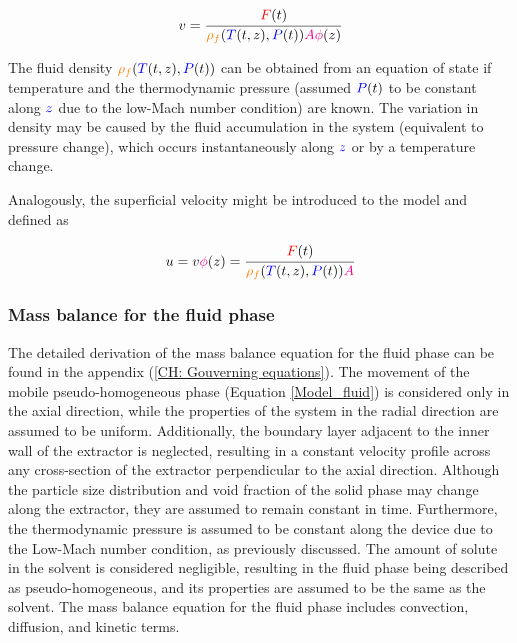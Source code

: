 \documentclass[../Article_Model_Parameters.tex]{subfiles}
\begin{document}
	{\footnotesize
	\begin{equation}
		v = \cfrac{{\color{red}F}(t)}{{\color{orange}\rho_f}({\color{blue}T}(t,z),{\color{blue}P}(t)) {\color{magenta}A\phi}(z)} 
	\end{equation}
	}
	
	The fluid density ${\color{orange}\rho_f}({\color{blue}T}(t,z),{\color{blue}P}(t))$ can be obtained from an equation of state if temperature and the thermodynamic pressure (assumed ${\color{blue}P}(t)$ to be constant along ${\color{blue}z}$ due to the low-Mach number condition) are known. The variation in density may be caused by the fluid accumulation in the system (equivalent to pressure change), which occurs instantaneously along ${\color{blue}z}$ or by a temperature change. 
	
	Analogously, the superficial velocity might be introduced to the model and defined as
	
	{\footnotesize
		\begin{equation}
			u = v {\color{magenta}\phi}(z) = \cfrac{{\color{red}F}(t)}{{\color{orange}\rho_f}({\color{blue}T}(t,z),{\color{blue}P}(t)) {\color{magenta} A} }
		\end{equation}
	}
	
	\subsubsection{Mass balance for the fluid phase} \label{CH: Mass_balance_fluid}
	
	The detailed derivation of the mass balance equation for the fluid phase can be found in the appendix (\ref{CH: Gouverning equations}). The movement of the mobile pseudo-homogeneous phase (Equation \ref{Model_fluid}) is considered only in the axial direction, while the properties of the system in the radial direction are assumed to be uniform. Additionally, the boundary layer adjacent to the inner wall of the extractor is neglected, resulting in a constant velocity profile across any cross-section of the extractor perpendicular to the axial direction. Although the particle size distribution and void fraction of the solid phase may change along the extractor, they are assumed to remain constant in time. Furthermore, the thermodynamic pressure is assumed to be constant along the device due to the Low-Mach number condition, as previously discussed. The amount of solute in the solvent is considered negligible, resulting in the fluid phase being described as pseudo-homogeneous, and its properties are assumed to be the same as the solvent. The mass balance equation for the fluid phase includes convection, diffusion, and kinetic terms.
	
\end{document}
